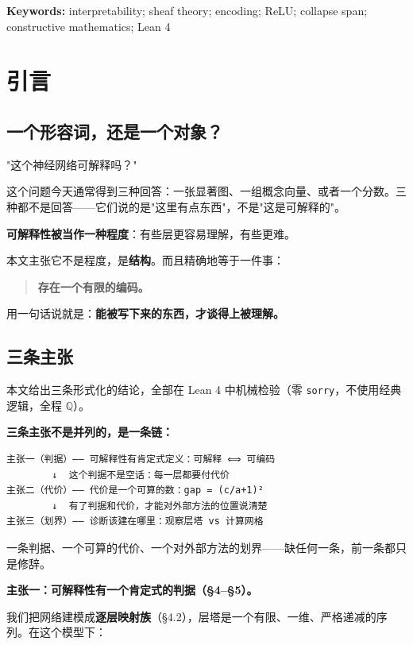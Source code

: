 \documentclass[11pt,a4paper]{ctexart}
\begin{document}
\textbf{Keywords:} interpretability; sheaf theory; encoding; ReLU; collapse span; constructive mathematics; Lean 4

\bigskip

\section{引言}

\subsection{一个形容词，还是一个对象？}

"这个神经网络可解释吗？"

这个问题今天通常得到三种回答：一张显著图、一组概念向量、或者一个分数。三种都不是回答——它们说的是"这里有点东西"，不是"这是可解释的"。

\textbf{可解释性被当作一种程度}：有些层更容易理解，有些更难。

本文主张它不是程度，是\textbf{结构}。而且精确地等于一件事：

\begin{quote}
\textbf{存在一个有限的编码。}
\end{quote}

用一句话说就是：\textbf{能被写下来的东西，才谈得上被理解。}

\subsection{三条主张}

本文给出三条形式化的结论，全部在 Lean 4 中机械检验（零 \texttt{sorry}，不使用经典逻辑，全程 \ensuremath{\mathbb{Q}}）。

\textbf{三条主张不是并列的，是一条链：}

\begin{lstlisting}
主张一（判据）—— 可解释性有肯定式定义：可解释 ⟺ 可编码
        ↓  这个判据不是空话：每一层都要付代价
主张二（代价）—— 代价是一个可算的数：gap = (c/a+1)²
        ↓  有了判据和代价，才能对外部方法的位置说清楚
主张三（划界）—— 诊断该建在哪里：观察层塔 vs 计算网格
\end{lstlisting}

一条判据、一个可算的代价、一个对外部方法的划界——缺任何一条，前一条都只是修辞。

\textbf{主张一：可解释性有一个肯定式的判据（§4–§5）。}

我们把网络建模成\textbf{逐层映射族}（§4.2），层塔是一个有限、一维、严格递减的序列。在这个模型下：
\end{document}
